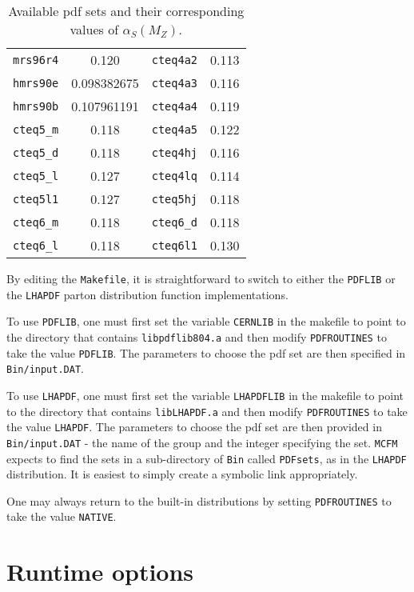 \documentclass[12pt]{article}
\begin{document}
\begin{table}[h]
\begin{center}
\begin{tabular}{|c|c||c|c|}
{\tt mrs96r4}   &  0.120       & {\tt cteq4a2}  &  0.113  \\
{\tt hmrs90e}   &  0.098382675 & {\tt cteq4a3}  &  0.116  \\
{\tt hmrs90b}   &  0.107961191 & {\tt cteq4a4}  &  0.119  \\
{\tt cteq5\_m}  &  0.118       & {\tt cteq4a5}  &  0.122  \\
{\tt cteq5\_d}  &  0.118       & {\tt cteq4hj}  &  0.116  \\
{\tt cteq5\_l}  &  0.127       & {\tt cteq4lq}  &  0.114  \\
{\tt cteq5l1}   &  0.127       & {\tt cteq5hj}  &  0.118  \\
{\tt cteq6\_m}  &  0.118       & {\tt cteq6\_d} &  0.118  \\
{\tt cteq6\_l}  &  0.118       & {\tt cteq6l1}  &  0.130  \\
\hline
\end{tabular}
\end{center}
\caption{Available pdf sets and their corresponding values of
$\alpha_S(M_Z)$.}
\label{pdlabel}
\end{table}

By editing the {\tt Makefile}, it is straightforward to switch to
either the {\tt PDFLIB} or the {\tt LHAPDF} parton distribution
function implementations.

To use {\tt PDFLIB}, one must first set the variable {\tt CERNLIB}
in the makefile to point to the directory that contains
{\tt libpdflib804.a} and then modify {\tt PDFROUTINES} to
take the value {\tt PDFLIB}. The parameters to choose the
pdf set are then specified in {\tt Bin/input.DAT}.

To use {\tt LHAPDF}, one must first set the variable {\tt LHAPDFLIB}
in the makefile to point to the directory that contains
{\tt libLHAPDF.a} and then modify {\tt PDFROUTINES} to
take the value {\tt LHAPDF}. The parameters to choose the
pdf set are then provided in {\tt Bin/input.DAT} - 
the name of the group and the integer specifying 
the set.
{\tt MCFM} expects to find the sets in a sub-directory of {\tt Bin} called
{\tt PDFsets}, as in the {\tt LHAPDF} distribution. It is easiest to
simply create a symbolic link appropriately.

One may always return to the built-in distributions by setting
{\tt PDFROUTINES} to take the value {\tt NATIVE}.

\section{Runtime options}
\end{document}
